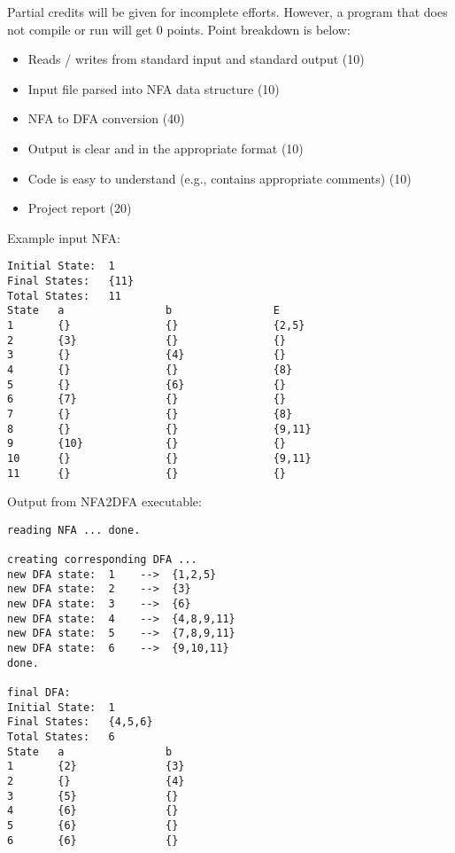 \documentclass[11pt]{article}
\begin{document}
Partial credits will be given for incomplete efforts. However, a program
that does not compile or run will get 0 points. Point breakdown is below:

\begin{itemize}
\item Reads / writes from standard input and standard output            (10)
\item Input file parsed into NFA data structure                         (10)
\item NFA to DFA conversion                                             (40)
\item Output is clear and in the appropriate format                     (10)
\item Code is easy to understand (e.g., contains appropriate comments)  (10)
\item Project report                                                    (20)
\end{itemize}

\newpage

\noindent
Example input NFA:
\begin{verbatim}
Initial State:  1
Final States:   {11}
Total States:   11
State   a                b                E
1       {}               {}               {2,5}
2       {3}              {}               {}
3       {}               {4}              {}
4       {}               {}               {8}
5       {}               {6}              {}
6       {7}              {}               {}
7       {}               {}               {8}
8       {}               {}               {9,11}
9       {10}             {}               {}
10      {}               {}               {9,11}
11      {}               {}               {}
\end{verbatim}

\noindent
Output from NFA2DFA executable:
\begin{verbatim}
reading NFA ... done.

creating corresponding DFA ...
new DFA state:  1    -->  {1,2,5}
new DFA state:  2    -->  {3}
new DFA state:  3    -->  {6}
new DFA state:  4    -->  {4,8,9,11}
new DFA state:  5    -->  {7,8,9,11}
new DFA state:  6    -->  {9,10,11}
done.

final DFA:
Initial State:  1
Final States:   {4,5,6}
Total States:   6
State   a                b
1       {2}              {3}
2       {}               {4}
3       {5}              {}
4       {6}              {}
5       {6}              {}
6       {6}              {}
\end{verbatim}
\end{document}
